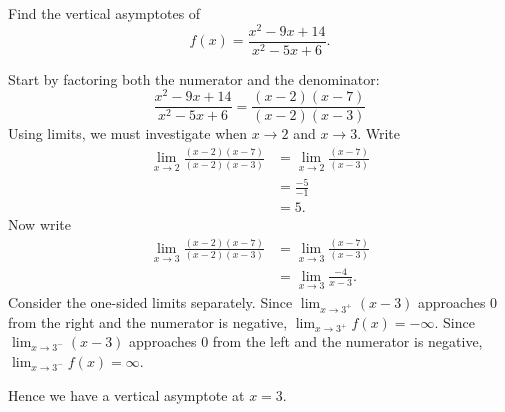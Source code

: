 \documentclass{ximera}
\begin{document}
\begin{example}
Find the vertical asymptotes of 
\[
f(x) = \frac{x^2-9x+14}{x^2-5x+6}.
\]

\begin{explanation}
Start by factoring both the numerator and the denominator:
\[
\frac{x^2-9x+14}{x^2-5x+6} = \frac{(x-2)(x-7)}{(x-2)(x-3)}
\]
Using limits, we must investigate when $x\to 2$ and $x\to 3$. Write
\begin{align*}
\lim_{x\to 2} \frac{(x-2)(x-7)}{(x-2)(x-3)} &= \lim_{x\to 2} \frac{(x-7)}{(x-3)}\\
&= \frac{-5}{-1}\\
&=5.
\end{align*}
Now write
\begin{align*}
\lim_{x\to 3} \frac{(x-2)(x-7)}{(x-2)(x-3)} &= \lim_{x\to 3} \frac{(x-7)}{(x-3)}\\
&= \lim_{x\to 3}\frac{-4}{x-3}.
\end{align*}
Consider the one-sided limits separately.  Since $\lim_{x\to 3^+}
(x-3)$ approaches $0$ from the right and the numerator is negative,
$\lim_{x\to 3^+} f(x) = -\infty$. Since $\lim_{x\to 3^-} (x-3)$
approaches $0$ from the left and the numerator is negative,
$\lim_{x\to 3^-} f(x) = \infty$.
\begin{image}
\end{image}
Hence we have a vertical asymptote at $x=3$.
\end{explanation}
\end{example}
\end{document}
